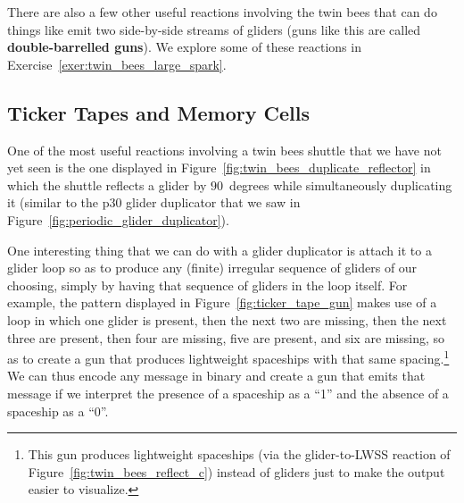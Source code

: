 There are also a few other useful reactions involving the twin bees that can do things like emit two side-by-side streams of gliders (guns like this are called \textbf{double-barrelled guns}). We explore some of these reactions in Exercise~\ref{exer:twin_bees_large_spark}.


\subsection{Ticker Tapes and Memory Cells}\label{sec:p46_ticker_tape}

One of the most useful reactions involving a twin bees shuttle that we have not yet seen is the one displayed in Figure~\ref{fig:twin_bees_duplicate_reflector} in which the shuttle reflects a glider by $90$~degrees while simultaneously duplicating it (similar to the p$30$ glider duplicator that we saw in Figure~\ref{fig:periodic_glider_duplicator}).

One interesting thing that we can do with a glider duplicator is attach it to a glider loop so as to produce any (finite) irregular sequence of gliders of our choosing, simply by having that sequence of gliders in the loop itself. For example, the pattern displayed in Figure~\ref{fig:ticker_tape_gun} makes use of a loop in which one glider is present, then the next two are missing, then the next three are present, then four are missing, five are present, and six are missing, so as to create a gun that produces lightweight spaceships with that same spacing.\footnote{This gun produces lightweight spaceships (via the glider-to-LWSS reaction of Figure~\ref{fig:twin_bees_reflect_c}) instead of gliders just to make the output easier to visualize.} We can thus encode any message in binary and create a gun that emits that message if we interpret the presence of a spaceship as a ``1'' and the absence of a spaceship as a ``0''.

